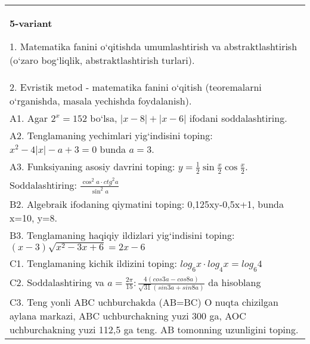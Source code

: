 \documentclass{article}
\begin{document}
\begin{tabular}{m{17cm}}
\textbf{5-variant}

1. Matematika fanini o‘qitishda umumlashtirish va abstraktlashtirish (o‘zaro bog‘liqlik, abstraktlashtirish turlari). \\
2. Evristik metod - matematika fanini o‘qitish (teoremalarni o‘rganishda, masala yechishda foydalanish). \\
A1. Agar \(2^{x} = 152\) bo‘lsa, \(|x - 8| + |x - 6|\) ifodani soddalashtiring. \\
A2. Tenglamaning yechimlari yig‘indisini toping: \(x^2 - 4|x| - a + 3 = 0\) bunda \(a = 3\). \\
A3. Funksiyaning asosiy davrini toping: \(y = \frac{1}{2}\sin{\frac{x}{2}\cos\frac{x}{2}}\). \\
Soddalashtiring: \(\frac{\cos^{2}a \cdot {ctg}^{2}a}{\sin^{2}a}\) \\
B2. Algebraik ifodaning qiymatini toping: 0,125xy-0,5x+1, bunda x=10, y=8. \\
B3. Tenglamaning haqiqiy ildizlari yig‘indisini toping: \((x-3) \sqrt{x^{2} - 3x + 6} = 2x - 6\) \\
C1. Tenglamaning kichik ildizini toping: \(log_{6}x \cdot log_{4}x = log_{6}4\) \\
C2. Soddalashtiring va \(a = \frac{2\pi}{15}:\frac{4 (cos3a - cos8a) }{\sqrt{31} (sin3a + sin8a) }\) da hisoblang \\
C3. Teng yonli ABC uchburchakda (AB=BC) O nuqta chizilgan aylana markazi, ABC uchburchakning yuzi 300 ga, AOC uchburchakning yuzi 112,5 ga teng. AB tomonning uzunligini toping. \\

\end{tabular}
\vspace{1cm}
\end{document}
